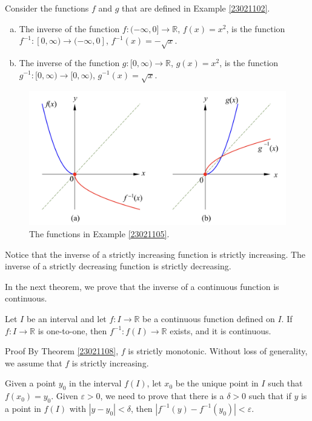 \begin{example}
\begin{example}[label=23021105]{}
Consider the functions $f$ and $g$ that are defined in Example \ref{23021102}. 
\begin{enumerate}[(a)]
\item The inverse of the function
  $f:(-\infty, 0]\rightarrow\mathbb{R}$, $f(x)=x^2$, is the function $f^{-1}:[0, \infty)\to (-\infty, 0]$, $f^{-1}(x)=-\sqrt{x}$.
\item The inverse of the function
$g:[0, \infty)\rightarrow\mathbb{R}$, $g(x)=x^2$, is the function $g^{-1}:[0, \infty)\to [0, \infty)$, $g^{-1}(x)=\sqrt{x}$.\end{enumerate}
\end{example}
\begin{figure}[ht]
\centering
\includegraphics[scale=0.2]{Picture16.png}
\caption{  The functions  in Example \ref{23021105}.}\label{figure16}
\end{figure}
Notice that the inverse of a strictly increasing function is strictly increasing. The inverse of a strictly decreasing function is strictly decreasing.


In the next theorem, we prove that the inverse of a continuous function   is continuous. 
\begin{theorem}[label=23021106]{}
Let $I$ be an interval and let $f:I\to\mathbb{R}$ be a continuous function defined on $I$. If $f:I\rightarrow\mathbb{R}$ is one-to-one, then $f^{-1}:f(I)\to\mathbb{R}$ exists, and it is continuous.


\end{theorem}
\begin{myproof}
{Proof}
By Theorem \ref{23021108}, $f$ is strictly monotonic. Without loss of generality, we assume that $f$ is strictly increasing. 

 Given  a point $y_0$ in the interval $f(I)$, let $x_0$ be the unique point in $I$ such that $f(x_0)=y_0$. Given $\varepsilon>0$, we need to prove that there is a $\delta>0$ such that if $y$ is a point in $f(I)$ with $|y-y_0|<\delta$, then $|f^{-1}(y)-f^{-1}(y_0)|<\varepsilon$.


\end{myproof}
\end{example}
